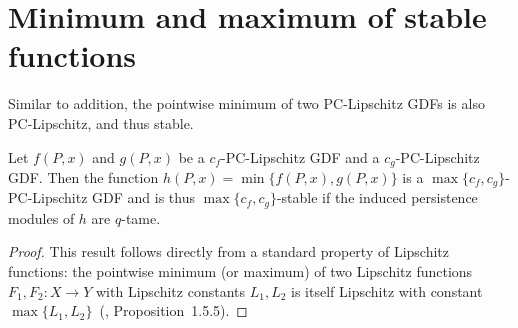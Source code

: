 \section{Minimum and maximum of stable functions}

Similar to addition, the pointwise minimum of two PC-Lipschitz GDFs is also
PC-Lipschitz, and thus stable.
\begin{theorem}
    \label{thm:min_pc_lipschitz}
    Let $f(P, x)$ and $g(P, x)$ be a $c_f$-PC-Lipschitz GDF and a
    $c_g$-PC-Lipschitz GDF.
    Then the function $h(P, x) = \min\{f(P, x), g(P, x)\}$
    is a $\max\{c_f, c_g\}$-PC-Lipschitz GDF and is thus $\max\{c_f, c_g\}$-stable
    if the induced persistence modules of $h$ are $q$-tame.
\end{theorem}
\begin{proof}
    This result follows directly from a standard property of Lipschitz
    functions: the pointwise minimum (or maximum) of two Lipschitz functions
    $F_1, F_2: X \to Y$ with Lipschitz constants $L_1, L_2$ is itself
    Lipschitz with constant $\max\{L_1, L_2\}$~(\cite{weaver2018lipschitz},
    Proposition~1.5.5).
\end{proof}

